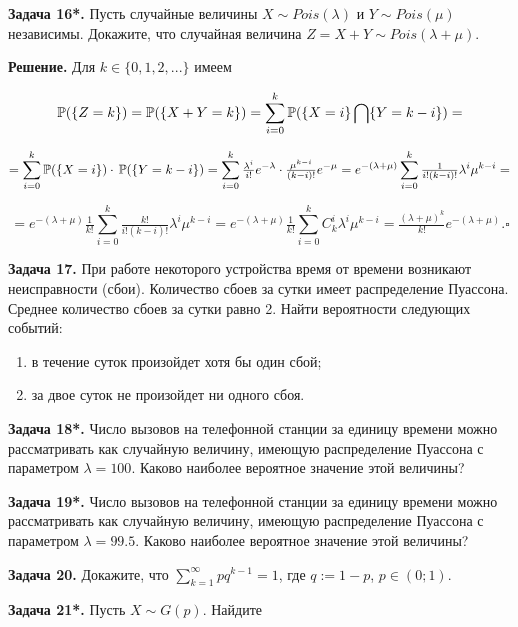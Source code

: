 \textbf{Задача 16*.} Пусть случайные величины $X\sim Pois(\lambda )$ и $Y\sim Pois(\mu )$ независимы. Докажите, что случайная величина $Z=X+Y\sim Pois(\lambda +\mu )$.

\textbf{Решение.} Для $k\in \{ 0,1,2,...\} $ имеем 

\[{\rm {\mathbb P}}(\{ Z=k\} )={\rm {\mathbb P}}(\{ X+Y=k\} )=\sum _{i=0}^{k}{\rm {\mathbb P}}(\{ X=i\} \bigcap \{ Y=k-i\} ) =\] 

\[=\sum _{i=0}^{k}{\rm {\mathbb P}}(\{ X=i\} )\cdot \,  {\rm {\mathbb P}}(\{ Y=k-i\} )=\sum _{i=0}^{k}{\tfrac{\lambda ^{i} }{i!}} e^{-\lambda } \cdot {\tfrac{\mu ^{k-i} }{(k-i)!}} e^{-\mu }  =e^{-(\lambda +\mu )} \sum _{i=0}^{k}{\tfrac{1}{i!(k-i)!}}  \lambda ^{i} \mu ^{k-i} =\] 

\[=e^{-(\lambda +\mu )} {\tfrac{1}{k!}} \sum _{i=0}^{k}{\tfrac{k!}{i!(k-i)!}}  \lambda ^{i} \mu ^{k-i} =e^{-(\lambda +\mu )} {\tfrac{1}{k!}} \sum _{i=0}^{k}C_{k}^{i}  \lambda ^{i} \mu ^{k-i} ={\tfrac{(\lambda +\mu )^{k} }{k!}} e^{-(\lambda +\mu )} . \square \] 

\textbf{Задача 17.} При работе некоторого устройства время от времени возникают неисправности (сбои). Количество сбоев за сутки имеет распределение Пуассона. Среднее количество сбоев за сутки равно 2. Найти вероятности следующих событий:

\begin{enumerate}
\item  в течение суток произойдет хотя бы один сбой;

\item  за двое суток не произойдет ни одного сбоя.
\end{enumerate}

\textbf{Задача 18*.} Число вызовов на телефонной станции за единицу времени можно рассматривать как случайную величину, имеющую распределение Пуассона с параметром $\lambda =100$. Каково наиболее вероятное значение этой величины?

\textbf{Задача 19*.} Число вызовов на телефонной станции за единицу времени можно рассматривать как случайную величину, имеющую распределение Пуассона с параметром $\lambda =99.5$. Каково наиболее вероятное значение этой величины?

\textbf{Задача 20.} Докажите, что $\sum _{k=1}^{\infty }pq^{k-1}  =1$, где $q:=1-p$, $p\in (0;1)$.

\textbf{Задача 21*.} Пусть $X\sim G(p)$. Найдите

